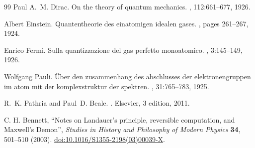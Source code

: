 \begin{thebibliography}{99}
 Paul A.~M. Dirac.
\newblock On the theory of quantum mechanics.
, 112:661--677, 1926.

 Albert Einstein.
\newblock Quantentheorie des einatomigen idealen gases.
,
  pages 261--267, 1924.

 Enrico Fermi.
\newblock Sulla quantizzazione del gas perfetto monoatomico.
, 3:145--149, 1926.

 Wolfgang Pauli.
\newblock Über den zusammenhang des abschlusses der elektronengruppen im atom
  mit der komplexstruktur der spektren.
, 31:765--783, 1925.

 R.~K. Pathria and Paul~D. Beale.
.
\newblock Elsevier, 3 edition, 2011.

 C. H. Bennett, ``Notes on Landauer's principle,
reversible computation, and Maxwell's Demon'', \emph{Studies in History
and Philosophy of Modern Physics} \textbf{34}, 501--510 (2003).
\href{https://doi.org/10.1016/S1355-2198(03)00039-X}{doi:10.1016/S1355-2198(03)00039-X}.
\end{thebibliography}
